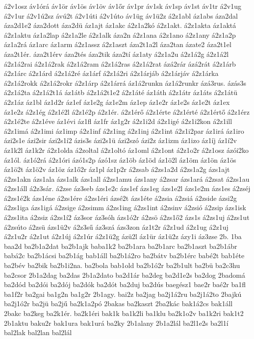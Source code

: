 {á2v1osz
áv1órá
áv1ör
áv1ös
áv1öv
áv1őr
áv1pr
áv1sk
áv1sp
áv1st
áv1tr
á2v1ug
á2v1ur
á2v1ú2sz
ávú2t
á2v1úti
á2v1úto
áv1üg
áv1ü2z
á2z1abl
áz1abs
áza2dal
áza2d1e2
áza2dott
áza2dü
áz1ajt
áz1akc
á2z1a2kó
á2z1akt.
á2z1akta
áz1aktá
á2z1aktu
áz1a2lap
á2z1a2le
á2z1alk
áza2n
á2z1ana
á2z1ano
á2z1any
á2z1a2p
áz1a2rá
áz1arc
áz1arm
á2z1assz
á2z1aszt
áza2t1a2l
áza2tan
ázate2
áza2t1el
áza2t1ér.
áza2t1érv
áza2tés
áza2tik
áza2tí
áz1aty
á2z1a2u
á2z1á2g
á2z1á2l
á2z1á2rai
á2z1á2rak
á2z1á2ram
á2z1á2ras
á2z1á2rat
ázá2rár
ázá2rát
á2z1árb
á2z1árc
á2z1árd
á2z1á2ré
áz1árf
á2z1á2ri
á2z1árjáb
á2z1árjáv
á2z1árka
á2z1á2rokk
á2z1á2rokr
á2z1árp
á2z1árrá
áz1á2runkn
áz1á2runkr
ázá3rus.
ázás3s
á2z1á2ta
á2z1á2t1á
áz1átb
á2z1á2t1e2
á2z1áté
áz1áth
á2z1átr
áz1áts
á2z1átü
á2z1áz
áz1bl
áz1d2r
áz1ef
áz1e2g
áz1e2m
áz1ep
áz1e2r
áz1e2s
áz1e2t
áz1ex
áz1e2z
á2z1ég
á2z1é2l
á2z1é2p
á2z1ér.
á2z1érő
á2z1érte
á2z1érté
á2z1értő
á2z1érz
á2z1é2te
á2z1éve
áz1évi
áz1fl
áz1fr
áz1g2r
á2z1i2d
á2z1igé
á2z1i2kon
á2z1ill
á2z1imá
á2z1imi
áz1imp
á2z1inf
á2z1ing
á2z1inj
á2z1int
á2z1i2par
áz1irá
áz1iro
ázi2s1e
ázi2sir
ázi2s1í2
ázis3s
ázi2s1ü
ázi2szó
ázi2z
áz1izm
áz1izo
áz1íj
áz1í2v
áz1k2l
áz1k2r
á2z1olda
á2zoltal
á2z1oltó
áz1oml
á2z1ont
á2z1o2r
á2z1osz
ázói2ko
áz1ól.
áz1ó2rá
á2z1óri
ázó1s2p
ázó1sz
áz1öb
áz1öd
áz1ö2l
áz1öm
áz1ön
áz1ös
áz1ö2t
áz1ö2v
áz1öz
áz1ő2r
áz1pl
áz1p2r
á2zsab
á2zs1a2d
á2zs1a2g
ázs1ajt
á2zs1akn
ázs1ala
ázs1alk
ázs1all
á2zs1amu
ázs1any
á2zsar
ázs1ará
á2zsat
á2zs1au
á2zs1áll
á2z3sár.
á2zse
áz3seb
ázs1e2c
ázs1ef
ázs1eg
ázs1e2l
ázs1e2m
ázs1es
á2zséj
á2zs1é2k
ázs1éne
á2zs1ére
á2zs1éri
ázsé2t
ázs1éte
á2zsia
á2zsiá
á2zside
ázsi2g
á2zs1iga
ázs1igá
á2zsige
á2zsimm
á2zs1ing
á2zs1int
á2zsinv
á2zsió
á2zsip
ázs1isk
á2zs1ita
á2zsiz
á2zs1í2
áz3sor
áz3sóh
ázs1ó2r
á2zsö
á2zs1ő2
ázs1s
á2zs1uj
á2zs1ut
á2zsúto
á2zsü
ázs1ü2v
á2z3sű
áz3szá
ázs3zon
áz1t2r
á2z1ud
á2z1ug
á2z1uj
á2z1u2r
á2z1ut
á2z1új
á2z1úr
á2z1ü2g
ázü2l
áz1ür
áz1ü2z
ázy1i
áz3zse
2b.
1ba
baa2d
ba2b1a2dat
ba2b1ajk
baba1k2
ba2b1ara
ba2b1arc
ba2b1aszt
ba2b1ábr
babá2c
ba2b1ácsi
ba2b1ág
bab1áll
ba2b1á2ro
ba2bátv
ba2b1érc
babé2t
bab1éte
ba2bév
ba2bik
ba2b1i2na.
ba2bola
bab1old
ba2b1ó2r
ba2b1ult
ba2bü
ba2c3hu
ba2csor
2b1a2dag
ba2das
2b1a2dato
ba2d1ár
ba2deg
ba2d1e2s
ba2dog
2badomá
ba2dód
ba2dói
ba2dój
ba2dók
ba2dót
ba2duj
ba2dús
baegész1
bae2r
baé2r
ba1fl
ba1f2r
ba2gai
ba1g2n
ba1g2r
2b1agy.
bai2z
ba2jag
ba2j1á2ru
ba2j1á2to
2bajkú
ba2j1ó2r
ba2jü
ba2jű
ba2k1a2pó
2bakas
ba2kaszt
2ba2kác
bak1á2cs
bak1áll
2bakc
ba2keg
ba2k1ér.
ba2k1éri
bak1k
ba1k2li
ba1klu
ba2k1o2v
ba1k2ri
bak1t2
2b1aktu
baku2r
bak1ura
bak1urá
ba2ky
2b1alany
2b1a2lál
ba2l1e2s
ba2l1í
bal2lak
bal2lan
bal2lál
}
